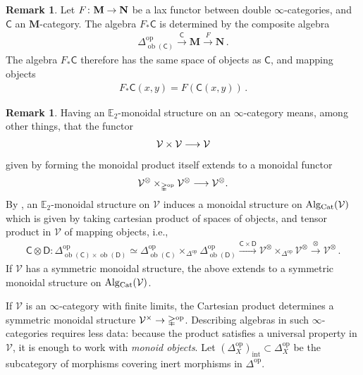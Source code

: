 \documentclass[10pt]{amsart}
\numberwithin{equation}{section}
\theoremstyle{definition}
\newtheorem{rem}[prop]{Remark}
\DeclareMathOperator{\interior}{int}
\DeclareMathOperator{\ob}{ob}
\DeclareMathOperator{\op}{op}
\newcommand{\Cat}{\mathrm{Cat}\vphantom{t}}
\newcommand{\Alg}{\mathrm{Alg}\vphantom{z}}
\newcommand{\bE}{\mathbb{E}}
\newcommand{\Simp}{\mathbb{\Delta}}
\newcommand{\cV}{\mathcal{V}}
\newcommand{\bfM}{\mathbf{M}}
\newcommand{\bfN}{\mathbf{N}}
\newcommand{\sfC}{\mathsf{C}}
\newcommand{\sfD}{\mathsf{D}}
\renewcommand{\to}{\mathchoice{\longrightarrow}{\rightarrow}{}{}}
\begin{document}
	\begin{rem}\label{rem:pushforward_of_CatAlg}
		Let $F\colon \bfM\to \bfN$ be a lax functor between double $\infty$-categories, and $\sfC$ an $\bfM$-category.
		The algebra $F_*\sfC$ is determined by the composite algebra
		\begin{align*}
			\Simp^{\op}_{\ob(\sfC)} \xrightarrow{\sfC} \bfM \xrightarrow{F} \bfN \,.
		\end{align*}
		The algebra $F_{*}\sfC$ therefore has the same space of objects as $\sfC$, and mapping objects
		\begin{align*}
			F_*\sfC(x,y) = F\left( \sfC(x,y) \right) \,.
		\end{align*}
	\end{rem}


	\begin{rem}\label{rem:monoidal_structure_on_Alg_Cat}
		Having an $\bE_{2}$-monoidal structure on an $\infty$-category means, among other things, that the functor
		\begin{align*}
			\cV \times \cV \to \cV
		\end{align*}
		given by forming the monoidal product itself extends to a monoidal functor
		\begin{align*}
			\cV^{\otimes} \times_{\Simp^{\op}} \cV^{\otimes} \to \cV^{\otimes}.
		\end{align*}
		By \cite*[Corollary 4.3.13]{GH}, an $\bE_{2}$-monoidal structure on $\cV$ induces a monoidal structure on $\Alg_{\Cat}(\cV)$ which is given by taking cartesian product of spaces of objects, and tensor product in $\cV$ of mapping objects, i.e.,
		\begin{align*}
		    \sfC \otimes \sfD \colon \Simp^{\op}_{\ob(\sfC) \times \ob(\sfD)} \simeq \Simp^{\op}_{\ob(\sfC)} \times_{\Simp^{\op}} \Simp^{\op}_{\ob(\sfD)} \xrightarrow{\sfC \times \sfD} \cV^{\otimes} \times_{\Simp^{\op}} \cV^{\otimes} \xrightarrow{ \otimes} \cV^{\otimes} \,.
		\end{align*}
		If $\cV$ has a symmetric monoidal structure, the above extends to a symmetric monoidal structure on $\Alg_{\Cat}(\cV)$.
	\end{rem}

    If $\cV$ is an $\infty$-category with finite limits, the Cartesian product determines a symmetric monoidal structure $\cV^{\times} \to \Simp^{\op}$.
	Describing algebras in such $\infty$-categories requires less data: because the product satisfies a universal property in $\cV$, it is enough to work with \textit{monoid objects}.
	Let $(\Simp_{X}^{\op})_{\interior} \subset \Simp^{\op}_{X}$ be the subcategory of morphisms covering inert morphisms in $\Simp^{\op}$.
\end{document}
